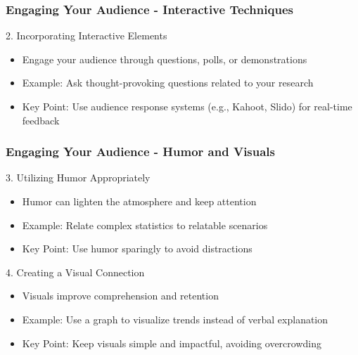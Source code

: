 \documentclass[aspectratio=169]{beamer}
\begin{document}
\begin{frame}[fragile]
    \frametitle{Engaging Your Audience - Interactive Techniques}
    \begin{block}{2. Incorporating Interactive Elements}
        \begin{itemize}
            \item Engage your audience through questions, polls, or demonstrations
            \item Example: Ask thought-provoking questions related to your research
            \item Key Point: Use audience response systems (e.g., Kahoot, Slido) for real-time feedback
        \end{itemize}
    \end{block}
\end{frame}

\begin{frame}[fragile]
    \frametitle{Engaging Your Audience - Humor and Visuals}
    \begin{block}{3. Utilizing Humor Appropriately}
        \begin{itemize}
            \item Humor can lighten the atmosphere and keep attention
            \item Example: Relate complex statistics to relatable scenarios
            \item Key Point: Use humor sparingly to avoid distractions
        \end{itemize}
    \end{block}

    \begin{block}{4. Creating a Visual Connection}
        \begin{itemize}
            \item Visuals improve comprehension and retention
            \item Example: Use a graph to visualize trends instead of verbal explanation
            \item Key Point: Keep visuals simple and impactful, avoiding overcrowding
        \end{itemize}
    \end{block}
\end{frame}
\end{document}
